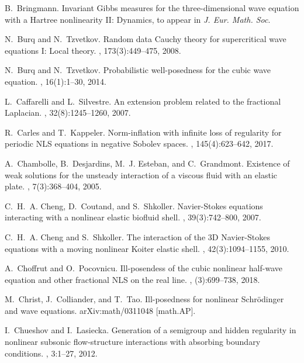 \documentclass[letterpaper, 11pt,  reqno]{amsart}
\newcommand{\1}{\hspace{0.5mm}\text{I}\hspace{0.2mm}}
\numberwithin{equation}{section}
\numberwithin{theorem}{section}
\begin{document}
\begin{thebibliography}{10}
B.~Bringmann.
\newblock Invariant {G}ibbs measures for the three-dimensional wave equation with a {H}artree nonlinearity II: {D}ynamics,
\newblock to appear in {\em J. Eur. Math. Soc}.

N.~Burq and N.~Tzvetkov.
\newblock Random data {C}auchy theory for supercritical wave equations {I}:
  {L}ocal theory.
, 173(3):449--475, 2008.

N.~Burq and N.~Tzvetkov.
\newblock Probabilistic well-posedness for the cubic wave equation.
, 16(1):1--30, 2014.

L.~Caffarelli and L.~Silvestre.
\newblock An extension problem related to the fractional {L}aplacian.
, 32(8):1245--1260, 2007.

R.~Carles and T.~Kappeler.
\newblock Norm-inflation with infinite loss of regularity for periodic
  {N}{L}{S} equations in negative {S}obolev spaces.
, 145(4):623--642, 2017.

A.~Chambolle, B.~Desjardins, M.~J. Esteban, and C.~Grandmont.
\newblock Existence of weak solutions for the unsteady interaction of a viscous
  fluid with an elastic plate.
, 7(3):368--404, 2005.

C.~H.~A. Cheng, D.~Coutand, and S.~Shkoller.
\newblock Navier-{S}tokes equations interacting with a nonlinear elastic
  biofluid shell.
, 39(3):742--800, 2007.

C.~H.~A. Cheng and S.~Shkoller.
\newblock The interaction of the 3{D} {N}avier-{S}tokes equations with a moving
  nonlinear {K}oiter elastic shell.
, 42(3):1094--1155, 2010.

A.~Choffrut and O.~Pocovnicu.
\newblock Ill-posendess of the cubic nonlinear half-wave equation and other
  fractional {N}{L}{S} on the real line.
, (3):699--738, 2018.

M.~Christ, J.~Colliander, and T.~Tao.
\newblock Ill-posedness for nonlinear {S}chr\"{o}dinger and wave equations.
arXiv:math/0311048 [math.AP].

I.~Chueshov and I.~Lasiecka.
\newblock Generation of a semigroup and hidden regularity in nonlinear subsonic flow-structure interactions with absorbing boundary conditions.
, 3:1--27, 2012.


\end{thebibliography}
\end{document}
